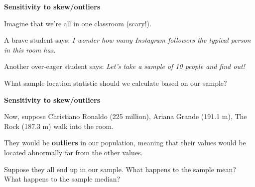\documentclass[ignorenonframetext,]{beamer}
\begin{document}
\begin{frame}{}
\protect\hypertarget{section-34}{}

\textbf{\large Sensitivity to skew/outliers}

\vspace{2ex}

Imagine that we're all in one classroom (scary!).

\vspace{2ex}

A brave student says:
\textit{I wonder how many Instagram followers the typical person in this room has.}

\vspace{2ex}

Another over-eager student says:
\textit{Let's take a sample of 10 people and find out!}

\vspace{2ex}

What sample location statistic should we calculate based on our sample?

\end{frame}

\begin{frame}{}
\protect\hypertarget{section-35}{}

\textbf{\large Sensitivity to skew/outliers}

\vspace{2ex}

Now, suppose Christiano Ronaldo (225 million), Ariana Grande (191.1 m),
The Rock (187.3 m) walk into the room.

\vspace{2ex}

They would be \textbf{outliers} in our population, meaning that their
values would be located abnormally far from the other values.

\vspace{2ex}

Suppose they all end up in our sample. What happens to the sample mean?
What happens to the sample median?

\end{frame}
\end{document}

